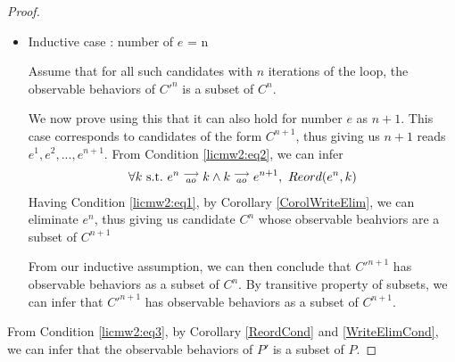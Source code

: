 \begin{proof}
\begin{itemize}
        \item Inductive case : number of $e$ = n

        Assume that for all such candidates with $n$ iterations of the loop, the observable behaviors of $C'^n$ is a subset of $C^n$.

        We now prove using this that it can also hold for number $e$ as $n + 1$. 
        This case corresponds to candidates of the form $C^{n+1}$, thus giving us $n+1$ reads $e^1, e^2,...,e^{n+1}$.
        From Condition \ref{licmw2:eq2}, we can infer 
        \begin{align*}
            \forall k \ \text{s.t.} \ e^n\stackrel{\longrightarrow}{_{ao}}k \wedge k\stackrel{\longrightarrow}{_{ao}}e^{n+1}, \ Reord(e^{n}, k)
        \end{align*}
        Having Condition \ref{licmw2:eq1}, by Corollary \ref{CorolWriteElim}, we can eliminate $e^{n}$, thus giving us candidate $C^{n}$ whose observable beahviors are a subset of $C^{n+1}$

        From our inductive assumption, we can then conclude that $C'^{n+1}$ has observable behaviors as a subset of $C^n$. 
        By transitive property of subsets, we can infer that $C'^{n+1}$ has observable behaviors as a subset of $C^{n+1}$.



    \end{itemize}
    
    From Condition \ref{licmw2:eq3}, by Corollary \ref{ReordCond} and \ref{WriteElimCond}, we can infer that the observable behaviors of $P'$ is a subset of $P$.

\end{proof}

